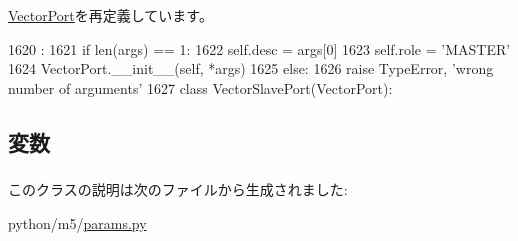 \hyperlink{classm5_1_1params_1_1VectorPort_ac775ee34451fdfa742b318538164070e}{VectorPort}を再定義しています。


\begin{DoxyCode}
1620                              :
1621         if len(args) == 1:
1622             self.desc = args[0]
1623             self.role = 'MASTER'
1624             VectorPort.__init__(self, *args)
1625         else:
1626             raise TypeError, 'wrong number of arguments'
1627 
class VectorSlavePort(VectorPort):
\end{DoxyCode}


\subsection{変数}
\hypertarget{classm5_1_1params_1_1VectorMasterPort_aafc566bb08a9f46485e7238669581c2b}{
\subsubsection[{desc}]{}}
\label{classm5_1_1params_1_1VectorMasterPort_aafc566bb08a9f46485e7238669581c2b}
\hypertarget{classm5_1_1params_1_1VectorMasterPort_a4e0cdb878325d53ad79a74504bf97a96}{
\subsubsection[{role}]{}}
\label{classm5_1_1params_1_1VectorMasterPort_a4e0cdb878325d53ad79a74504bf97a96}


このクラスの説明は次のファイルから生成されました:\begin{DoxyCompactItemize}
\item 
python/m5/\hyperlink{params_8py}{params.py}\end{DoxyCompactItemize}
